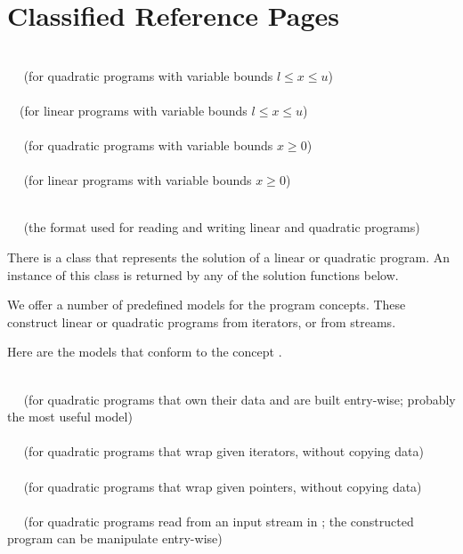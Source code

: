 \label{chapter:QPsolver}

\section{Classified Reference Pages}

\\
$\quad$ (for quadratic programs with variable bounds $l\leq x \leq u$) \\
 \\
$\quad$(for linear programs with variable bounds $l\leq x \leq u$)\\
\\
$\quad$ (for quadratic programs with variable bounds $x\geq 0$) \\
\\
$\quad$ (for linear programs with variable bounds $x\geq 0$)

\\
$\quad$ (the format used for reading and writing linear and quadratic 
programs)


There is a class that represents the solution of a linear
or quadratic program. An instance of this class is returned by any of 
the solution functions below.


We offer a number of predefined models for the program concepts. These
construct linear or quadratic programs from iterators, or from streams.

Here are the models that conform to the concept 
. 

\\
$\quad$ (for quadratic programs that own their data and are built entry-wise; probably the most useful model)\\
\\
$\quad$ (for quadratic programs that wrap given iterators, without copying 
data) \\
\\
$\quad$ (for quadratic programs that wrap given pointers, without copying 
data) \\
\\
$\quad$ (for quadratic programs read from an input stream in 
; the constructed program can be manipulate entry-wise)

